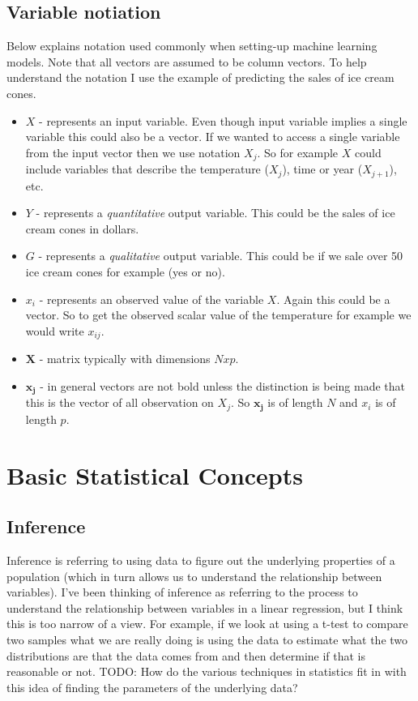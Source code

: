 \documentclass[paper=a4, fontsize=11pt]{scrartcl} %
\numberwithin{equation}{section} %
\numberwithin{figure}{section} %
\numberwithin{table}{section} %
\begin{document}
\subsection{Variable notiation}
\label{sec:notation}

Below explains notation used commonly when setting-up machine learning models. Note that all vectors are assumed to be column vectors. To help understand the notation I use the example of predicting the sales of ice cream cones. 
\vspace{2mm}

\begin{itemize}
\item $X$ - represents an input variable. Even though input variable implies a single variable this could also be a vector. If we wanted to access a single variable from the input vector then we use notation $X_j$. So for example $X$ could include variables that describe the temperature ($X_{j}$), time or year ($X_{j+1}$), etc. 
\item $Y$ - represents a \emph{quantitative} output variable. This could be the sales of ice cream cones in dollars.
\item $G$ - represents a \emph{qualitative} output variable. This could be if we sale over 50 ice cream cones for example (yes or no). 
\item $x_i$ - represents an observed value of the variable $X$. Again this could be a vector. So to get the observed scalar value of the temperature for example we would write $x_{ij}$. 
\item $\bm{X}$ - matrix typically with dimensions $Nxp$. 
\item $\bm{x_j}$ -  in general vectors are not bold unless the distinction is being made that this is the vector of all observation on $X_j$. So $\bm{x_j}$ is of length $N$ and $x_i$ is of length $p$.
\end{itemize}


\section{Basic Statistical Concepts}

\subsection{Inference}

Inference is referring to using data to figure out the underlying properties of a population (which in turn allows us to understand the relationship between variables). I've been thinking of inference as referring to the process to understand the relationship between variables in a linear regression, but I think this is too narrow of a view. For example, if we look at using a t-test to compare two samples what we are really doing is using the data to estimate what the two distributions are that the data comes from and then determine if that is reasonable or not. TODO: How do the various techniques in statistics fit in with this idea of finding the parameters of the underlying data?


\clearpage
\printglossaries
\end{document}
